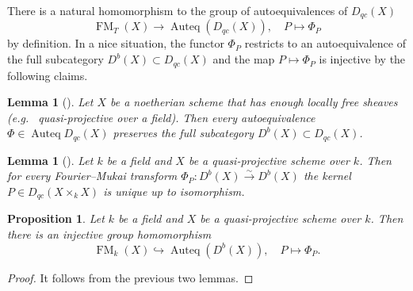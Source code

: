 \documentclass{amsart}
\numberwithin{equation}{section}
\theoremstyle{plain}
\newtheorem{lemma}[theorem]{Lemma}
\newtheorem{proposition}[theorem]{Proposition}
\theoremstyle{definition}
\DeclareMathOperator{\Auteq}{\mathrm{Auteq}}
\DeclareMathOperator{\FM}{\mathrm{FM}}
\begin{document}
There is a natural homomorphism to the group of autoequivalences of $D_{qc}(X)$
\begin{equation}\label{eq:FM-to-Auteq}
    \FM_T(X) \to \Auteq(D_{qc}(X)), \quad P \mapsto \Phi_P
\end{equation}
by definition.
In a nice situation, the functor $\Phi_P$ restricts to an autoequivalence of the full subcategory $D^b(X) \subset D_{qc}(X)$ and the map $P \mapsto \Phi_P$ is injective by the following claims.
\begin{lemma}[{\cite[Proposition 7.4]{MR3861804}}]
    Let $X$ be a noetherian scheme that has enough locally free sheaves (e.g.~ quasi-projective over a field).
    Then every autoequivalence $\Phi \in \Auteq D_{qc}(X)$ preserves the full subcategory $D^b(X) \subset D_{qc}(X)$.
\end{lemma}
\begin{lemma}[{\cite[Theorem 1.5]{MR3556457}}]\label{lem:uniqueness-of-FM-kernel}
    Let $k$ be a field and $X$ be a quasi-projective scheme over $k$.
    Then for every Fourier--Mukai transform $\Phi_P \colon D^b(X) \xrightarrow{\sim} D^b(X)$ the kernel $P \in D_{qc}(X \times_k X)$ is unique up to isomorphism.
\end{lemma}
\begin{proposition}\label{prop:FM-to-Auteq}
    Let $k$ be a field and $X$ be a quasi-projective scheme over $k$.
    Then there is an injective group homomorphism
    \begin{equation}
        \FM_k(X) \hookrightarrow \Auteq(D^b(X)), \quad P \mapsto \Phi_P.
    \end{equation}
\end{proposition}
\begin{proof}
    It follows from the previous two lemmas.
\end{proof}
\end{document}
